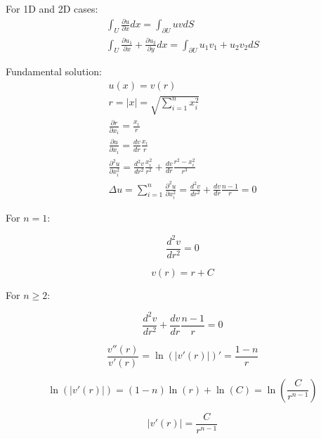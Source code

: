 \documentclass{blog}
\begin{document}
\begin{example}
    For 1D and 2D cases:
    \begin{gather*}
        \int_{U} \frac{\partial u}{\partial x} dx = \int_{\partial U} uv dS \\
        \int_{U} \frac{\partial u_{1}}{\partial x} + \frac{\partial u_{2}}{\partial y} dx =
        \int_{\partial U} u_{1}v_{1} + u_{2}v_{2} dS
    \end{gather*}
\end{example}

Fundamental solution:
\begin{gather*}
    u(x) = v(r) \\
    r = |x| = \sqrt{\sum_{i=1}^{n}x_{i}^{2}} \\
    \frac{\partial r}{\partial x_{i}} = \frac{x_{i}}{r} \\
    \frac{\partial u}{\partial x_{i}} = \frac{dv}{dr} \frac{x_{i}}{r} \\
    \frac{\partial^{2} u}{\partial x_{i}^{2}} = \frac{d^{2}v}{dr^{2}} \frac{x_{i}^{2}}{r^{2}}
    + \frac{dv}{dr} \frac{r^{2} - x_{i}^{2}}{r^{3}} \\
    \Delta u = \sum_{i=1}^{n} \frac{\partial^{2} u}{\partial x_{i}^{2}} = \frac{d^{2}v}{dr^{2}} + \frac{dv}{dr}\frac{n-1}{r} = 0
\end{gather*}

For $n = 1$:

\begin{equation*}
    \frac{d^{2}v}{dr^{2}} = 0
\end{equation*}

\begin{equation*}
    v(r) = r + C
\end{equation*}

For $n \geq 2$:

\begin{equation*}
    \frac{d^{2}v}{dr^{2}} + \frac{dv}{dr}\frac{n-1}{r} = 0
\end{equation*}

\begin{equation*}
    \frac{v''(r)}{v'(r)} = \ln\left(\left| v'(r) \right|\right)' = \frac{1-n}{r}
\end{equation*}

\begin{equation*}
    \ln\left(\left| v'(r) \right|\right) = (1-n)\ln(r) + \ln(C) = \ln\left( \frac{C}{r^{n-1}} \right)
\end{equation*}

\begin{equation*}
    \left| v'(r) \right| = \frac{C}{r^{n-1}}
\end{equation*}
\end{document}
